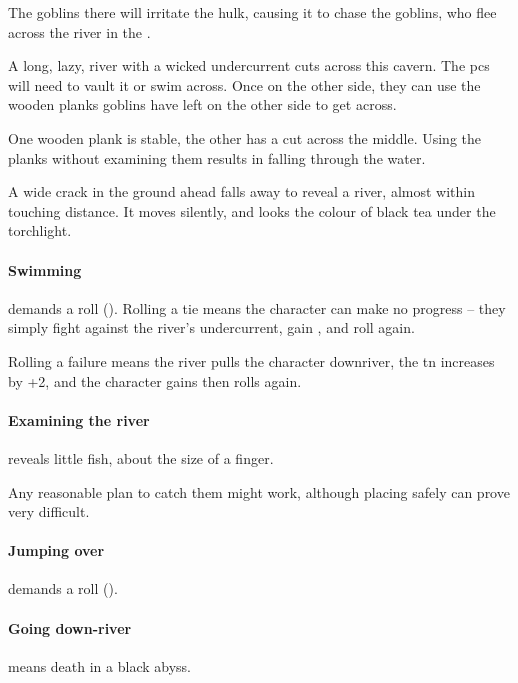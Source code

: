 \begin{multicols}{2}
The goblins there will irritate the \gls{hulk}, causing it to chase the goblins, who flee across the river in the .


A long, lazy, river with a wicked undercurrent cuts across this cavern.
The \glspl{pc} will need to vault it or swim across.
Once on the other side, they can use the wooden planks goblins have left on the other side to get across.

One wooden plank is stable, the other has a cut across the middle.
Using the planks without examining them results in  falling through the water.

\begin{boxtext}
  A wide crack in the ground ahead falls away to reveal a river, almost within touching distance.
  It moves silently, and looks the colour of black tea under the torchlight.
\end{boxtext}

\paragraph{Swimming}
demands a  roll (\tn[10]).
Rolling a tie means the character can make no progress -- they simply fight against the river's undercurrent, gain , and roll again.

Rolling a failure means the river pulls the character downriver, the \gls{tn} increases by +2, and the character gains  then rolls again.

\paragraph{Examining the river}
reveals little fish, about the size of a finger.

Any reasonable plan to catch them might work, although placing  safely can prove very difficult.

\paragraph{Jumping over}
demands a  roll (\tn[12]).

\paragraph{Going down-river}
means death in a black abyss.


\end{multicols}
